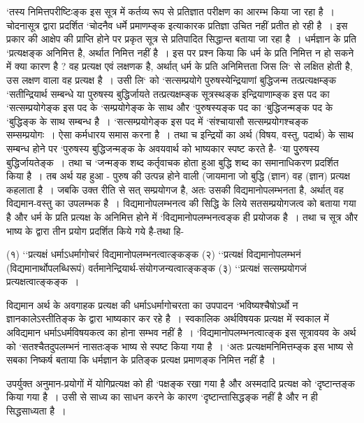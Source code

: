 {‘तस्य निमित्तपरीष्टिःङ्क इस सूत्र में कर्तव्य रूप से प्रतिज्ञात परीक्षण का आरम्भ किया जा रहा है~। चोदनासूत्र द्वारा प्रदर्शित ‘चोदनैव धर्मे प्रमाणम्ङ्क इत्याकारक प्रतिज्ञा उचित नहीं प्रतीत हो रही है~। इस प्रकार की आक्षेप की प्राप्ति होने पर प्रकृत सूत्र से प्रतिपादित सिद्धान्त बताया जा रहा है~। धर्मज्ञान के प्रति ‘प्रत्यक्षङ्क अनिमित्त है, अर्थात निमित्त नहीं है~। इस पर प्रश्न किया कि धर्म के प्रति निमित्त न हो सकने में क्या कारण है ? वह प्रत्यक्ष एवं लक्षणक है, अर्थात् धर्म के प्रति अनिमित्तता जिस लि‘ से लक्षित होती है, उस लक्षण वाला वह प्रत्यक्ष है~। उसी लि‘ को ‘सत्सम्प्रयोगे पुरुषस्येन्द्रियाणां बुद्धिजन्म तत्प्रत्यक्षम्ङ्क ‘सतीन्द्रियार्थ सम्बन्धे या पुरुषस्य बुद्धिर्जायते तत्प्रत्यक्षम्ङ्क सूत्रस्थङ्क इन्द्रियाणाम्ङ्क इस पद का ‘सत्सम्प्रयोगेङ्क इस पद के ‘सम्प्रयोगेङ्क के साथ और ‘पुरुषस्यङ्क पद का ‘बुद्धिजन्मङ्क पद के ‘बुद्धिङ्क के साथ सम्बन्ध है~। ‘सत्सम्प्रयोगेङ्क इस पद में ‘संश्चायासौ सत्सम्प्रयोगश्चङ्क सम्सम्प्रयोगः~। ऐसा कर्मधारय समास करना है~। तथा च इन्द्रियों का अर्थ (विषय, वस्तु, पदार्थ) के साथ सम्बन्ध होने पर ‘पुरुषस्य बुद्धिजन्मङ्क के अवयवार्थ को भाष्यकार स्पष्ट करते है- ‘या पुुरुषस्य बुद्धिर्जायतेङ्क~। तथा च ‘जन्मङ्क शब्द कर्तृवाचक होता हुआ बुद्धि शब्द का समानाधिकरण प्रदर्शित किया है~। तब अर्थ यह हुआ - पुरुष की उत्पन्न होने वाली (जायमाना जो बुद्धि (ज्ञान) वह (ज्ञान) प्रत्यक्ष कहलाता है~। जबकि उक्त रीति से सत् सम्प्रयोगज है, अतः उसकी विद्यमानोपलम्भनता है, अर्थात् वह विद्यमान-वस्तु का उपलम्भक है~। विद्यमानोपलम्भनत्व की सिद्धि के लिये सतसम्प्रयोगजत्व को बताया गया है और धर्म के प्रति प्रत्यक्ष के अनिमित्त होने में ‘विद्यमानोपलम्भनत्वङ्क ही प्रयोजक है~। तथा च सूत्र और भाष्य के द्वारा तीन प्रयोग प्रदर्शित किये गये है-तथा हि-

(१) ‘‘प्रत्यक्षं धर्माऽधर्मागोचरं विद्यमानोपलम्भनत्वात्ङ्कङ्क
(२) ‘‘प्रत्यक्षं विद्यमानोपलम्भनं (विद्यमानार्थोपलब्धिरूपं) वर्तमानेन्द्रियार्थ-संयोगजन्यत्वात्ङ्कङ्क
(३) ‘‘प्रत्यक्षं सत्सम्प्रयोगजं प्रत्यक्षत्वात्ङ्कङ्क~।

विद्यमान अर्थ के अवगाहक प्रत्यक्ष की धर्माऽधर्मागोचरता का उपपादन ‘भविष्यश्चैषोऽर्थो न ज्ञानकालेऽस्तीतिङ्क के द्वारा भाष्यकार कर रहे है~। स्वकालिक अर्थविषयक प्रत्यक्ष में स्वकाल में अविद्यमान धर्माऽधर्मविषयकत्व का होना सम्भव नहीं है~। ‘विद्यमानोपलम्भनत्वात्ङ्क इस सूत्रावयव के अर्थ को ‘सतश्चैतदुपलम्भनं नासतःङ्क भाष्य से स्पष्ट किया गया है~। ‘अतः प्रत्यक्षमनिमित्तम्ङ्क इस भाष्य से सबका निष्कर्ष बताया कि धर्मज्ञान के प्रतिङ्क प्रत्यक्ष प्रमाणङ्क निमित्त नहीं है~। 

उपर्युक्त अनुमान-प्रयोगों में योगिप्रत्यक्ष को ही ‘पक्षङ्क रखा गया है और अस्मदादि प्रत्यक्ष को ‘दृष्टान्तङ्क किया गया है~। उसी से साध्य का साधन करने के कारण ‘दृष्टान्तासिद्धङ्क नहीं है और न ही सिद्धसाध्यता है~। 

}
